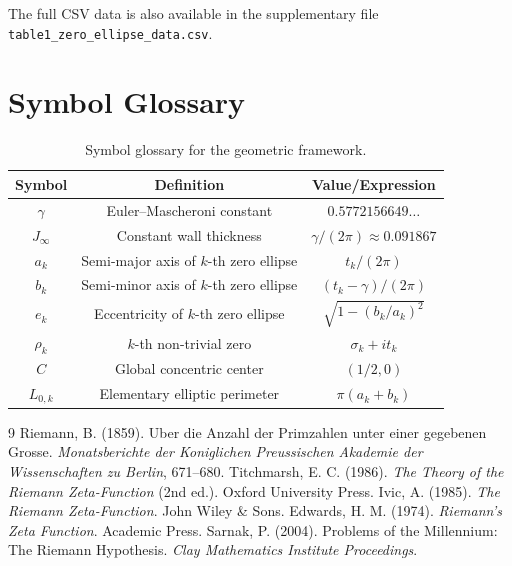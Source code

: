 \documentclass[12pt,a4paper]{article}
\theoremstyle{definition}
\begin{document}
The full CSV data is also available in the supplementary file \texttt{table1\_zero\_ellipse\_data.csv}.

\section{Symbol Glossary}
\label{app:symbols}

\begin{table}[H]
\centering
\begin{tabular}{c|c|c}
\hline
Symbol & Definition & Value/Expression \\
\hline
$\gamma$ & Euler--Mascheroni constant & $0.5772156649\ldots$ \\
$J_\infty$ & Constant wall thickness & $\gamma/(2\pi) \approx 0.091867$ \\
$a_k$ & Semi-major axis of $k$-th zero ellipse & $t_k/(2\pi)$ \\
$b_k$ & Semi-minor axis of $k$-th zero ellipse & $(t_k-\gamma)/(2\pi)$ \\
$e_k$ & Eccentricity of $k$-th zero ellipse & $\sqrt{1-(b_k/a_k)^2}$ \\
$\rho_k$ & $k$-th non-trivial zero & $\sigma_k + i t_k$ \\
$C$ & Global concentric center & $(1/2, 0)$ \\
$L_{0,k}$ & Elementary elliptic perimeter & $\pi(a_k+b_k)$ \\
\hline
\end{tabular}
\caption{Symbol glossary for the geometric framework.}
\label{tab:symbols}
\end{table}

\begin{thebibliography}{9}
 Riemann, B. (1859). Uber die Anzahl der Primzahlen unter einer gegebenen Grosse. \emph{Monatsberichte der Koniglichen Preussischen Akademie der Wissenschaften zu Berlin}, 671--680.
 Titchmarsh, E. C. (1986). \emph{The Theory of the Riemann Zeta-Function} (2nd ed.). Oxford University Press.
 Ivic, A. (1985). \emph{The Riemann Zeta-Function}. John Wiley \& Sons.
 Edwards, H. M. (1974). \emph{Riemann's Zeta Function}. Academic Press.
 Sarnak, P. (2004). Problems of the Millennium: The Riemann Hypothesis. \emph{Clay Mathematics Institute Proceedings}.
\end{thebibliography}
\end{document}
